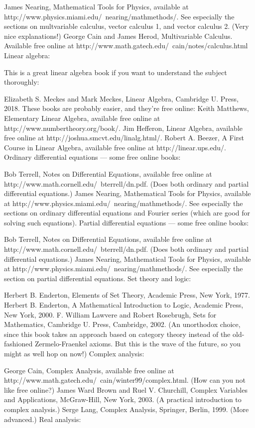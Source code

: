 \documentclass[10pt,a4paper]{book}
\theoremstyle{definition}
\begin{document}
James Nearing, Mathematical Tools for Physics, available at http://www.physics.miami.edu/~nearing/mathmethods/. See especially the sections on multvariable calculus, vector calculus 1, and vector calculus 2. (Very nice explanations!)
George Cain and James Herod, Multivariable Calculus. Available free online at http://www.math.gatech.edu/~cain/notes/calculus.html
Linear algebra:

This is a great linear algebra book if you want to understand the subject thoroughly:

Elizabeth S. Meckes and Mark Meckes, Linear Algebra, Cambridge U. Press, 2018.
These books are probably easier, and they're free online:
Keith Matthews, Elementary Linear Algebra, available free online at http://www.numbertheory.org/book/.
Jim Hefferon, Linear Algebra, available free online at http://joshua.smcvt.edu/linalg.html/.
Robert A. Beezer, A First Course in Linear Algebra, available free online at http://linear.ups.edu/.
Ordinary differential equations — some free online books:

Bob Terrell, Notes on Differential Equations, available free online at http://www.math.cornell.edu/~bterrell/dn.pdf. (Does both ordinary and partial differential equations.)
James Nearing, Mathematical Tools for Physics, available at http://www.physics.miami.edu/~nearing/mathmethods/. See especially the sections on ordinary differential equations and Fourier series (which are good for solving such equations).
Partial differential equations — some free online books:

Bob Terrell, Notes on Differential Equations, available free online at http://www.math.cornell.edu/~bterrell/dn.pdf. (Does both ordinary and partial differential equations.)
James Nearing, Mathematical Tools for Physics, available at http://www.physics.miami.edu/~nearing/mathmethods/. See especially the section on partial differential equations.
Set theory and logic:

Herbert B. Enderton, Elements of Set Theory, Academic Press, New York, 1977.
Herbert B. Enderton, A Mathematical Introduction to Logic, Academic Press, New York, 2000.
F. William Lawvere and Robert Rosebrugh, Sets for Mathematics, Cambridge U. Press, Cambridge, 2002. (An unorthodox choice, since this book takes an approach based on category theory instead of the old-fashioned Zermelo-Fraenkel axioms. But this is the wave of the future, so you might as well hop on now!)
Complex analysis:

George Cain, Complex Analysis, available free online at http://www.math.gatech.edu/~cain/winter99/complex.html. (How can you not like free online?)
James Ward Brown and Ruel V. Churchill, Complex Variables and Applications, McGraw-Hill, New York, 2003. (A practical introduction to complex analysis.)
Serge Lang, Complex Analysis, Springer, Berlin, 1999. (More advanced.)
Real analysis:
\end{document}
